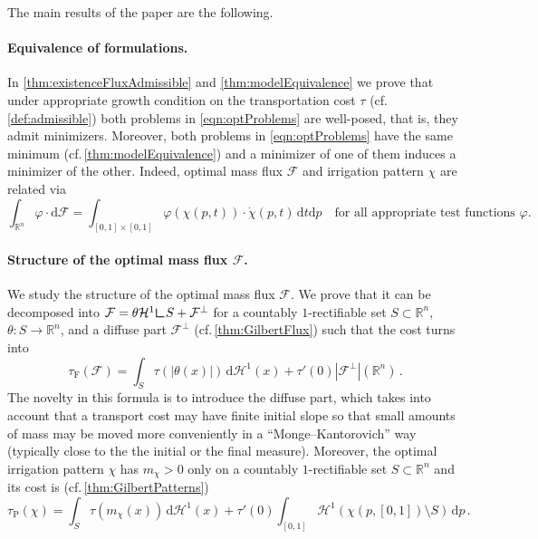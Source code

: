 \documentclass[10pt,a4paper,oneside,final]{article}
\newcommand{\R}{{\mathbb{R}}}
\newcommand{\de}{{\mathrm{d}}}
\newcommand{\hdone}{\mathcal{H}^1}
\newcommand{\restr}{{\mbox{\LARGE$\llcorner$}}}
\newcommand{\flux}{{\mathcal{F}}}
\newcommand{\JEnXia}[1][\tau]{#1_{\mathrm{F}}}%
\newcommand{\JEnMMS}[1][\tau]{#1_{\mathrm{P}}}%
\newcommand{\transportPath}{mass flux}
\numberwithin{equation}{section}
\theoremstyle{plain}
\theoremstyle{definition}
\theoremstyle{remark}
\begin{document}
The main results of the paper are the following.

\paragraph{Equivalence of formulations.}

In \cref{thm:existenceFluxAdmissible} and \cref{thm:modelEquivalence} we prove that under appropriate growth condition on the transportation cost $\tau$ (cf.\,\cref{def:admissible}) both problems in \eqref{eqn:optProblems} are well-posed, that is, they admit minimizers.
Moreover, both problems in \eqref{eqn:optProblems} have the same minimum (cf.\,\cref{thm:modelEquivalence}) and a minimizer of one of them induces a minimizer of the other.
Indeed, optimal \transportPath{} $\flux$ and irrigation pattern $\chi$ are related via
\begin{equation*}
\int_{\R^n}\varphi\cdot\de\flux=\int_{[0,1]\times[0,1]}\varphi(\chi(p,t))\cdot\dot\chi(p,t)\,\de t\de p \quad\text{for all appropriate test functions }\varphi.
\end{equation*}

\paragraph{Structure of the optimal \transportPath{} $\flux$.}

We study the structure of the optimal \transportPath{} $\flux$. We prove that it can be decomposed into $\flux=\theta\hdone\restr S+\flux^\perp$ for a countably $1$-rectifiable set $S\subset\R^n$, $\theta:S\to\R^n$, and a diffuse part $\flux^\perp$ (cf.\,\cref{thm:GilbertFlux}) such that the cost turns into
\begin{equation*}
\JEnXia(\flux)
=\int_{S}\tau(|\theta(x)|)\,\de\hdone(x)+\tau'(0)|\flux^\perp|(\R^n)\,.
\end{equation*}
The novelty in this formula is to introduce the diffuse part, which takes into account that a transport cost may have finite initial slope so that small amounts of mass may be moved more conveniently in a ``Monge--Kantorovich'' way (typically close to the the initial or the final measure).
Moreover, the optimal irrigation pattern $\chi$ has $m_\chi>0$ only on a countably $1$-rectifiable set $S\subset\R^n$ and its cost is (cf.\,\cref{thm:GilbertPatterns})
\begin{equation*}
\JEnMMS(\chi)
=\int_{S}\tau(m_{\chi}(x))\,\de\hdone(x)+\tau'(0)\int_{[0,1]}\hdone(\chi(p,[0,1])\setminus S)\,\de p\,.
\end{equation*}
\end{document}
